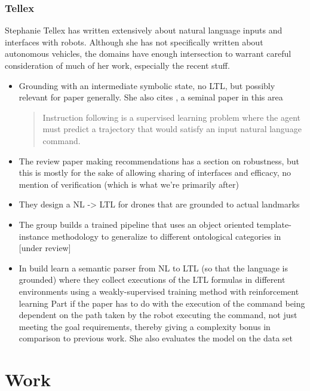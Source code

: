 \documentclass[a4paper, 11pt]{article}
\begin{document}
\subsubsection{Tellex}

Stephanie Tellex has written extensively about natural language inputs and
interfaces with robots. Although she has not specifically written about
autonomous vehicles, the domains have enough intersection to warrant careful
consideration of much of her work, especially the recent stuff.

\begin{itemize}

\item Grounding with an intermediate symbolic state, no LTL, but possibly
  relevant for paper generally. She also cites \cite{walkTalk}, a seminal paper in this area
\begin{quote}
Instruction following is a supervised learning problem
where the agent must predict a trajectory that would satisfy an
input natural language command. \cite{tellexInstr}
\end{quote}
\item The review paper \cite{MARGE2022101255} making recommendations has a
  section on robustness, but this is mostly for the sake of allowing sharing of
  interfaces and efficacy, no mention of verification (which is what we're
  primarily after)
\item They design a NL -> LTL for drones that are grounded to actual landmarks \cite{9197068}
\item The group builds a trained pipeline that uses an object oriented
  template-instance methodology to generalize to different ontological
  categories in  \cite{hsiung2021generalizing} [under review]

\item In \cite{patellearning} build learn a semantic parser from NL to LTL (so
that the language is grounded) where they collect executions of the LTL formulas
in different environments using a weakly-supervised training method with
reinforcement learning Part if the paper has to do with the execution of the
command being dependent on the path taken by the robot executing the command,
not just meeting the goal requirements, thereby giving a complexity bonus in
comparison to previous work. She also evaluates the model on the \cite{walkTalk}
data set
\end{itemize}



\section{Work} 
\end{document}
